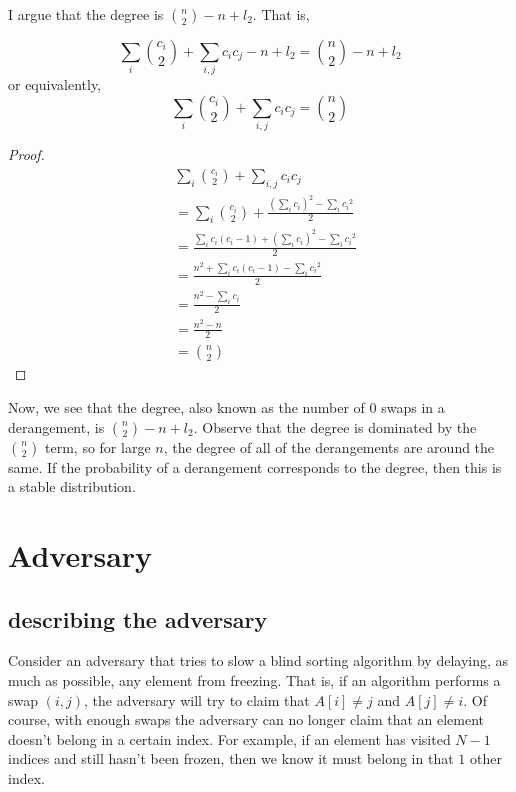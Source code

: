 \documentclass{article}
\begin{document}
I argue that the degree is ${n \choose 2} - n + l_2$. That is,

\[
    \sum_{i}{c_i \choose 2} + \sum_{i, j}{{c_i}{c_j}} - n + l_2 = {n \choose 2} - n  + l_2
\]
or equivalently,
\[
    \sum_{i}{c_i \choose 2} + \sum_{i, j}{{c_i}{c_j}} = {n \choose 2}
\]

\begin{proof}
        \begin{align}
            & \sum_{i}{c_i \choose 2} + \sum_{i, j}{{c_i}{c_j}}  \\\nonumber
            &=  \sum_{i}{c_i \choose 2} + \frac{(\sum_{i}{c_i})^2 - \sum_{i}{{c_i}^2}}{2} \\\nonumber
            &=  \frac{\sum_{i}{c_i(c_i -1)} + (\sum_{i}{c_i})^2 - \sum_{i}{{c_i}^2}}{2} \\\nonumber
            &=  \frac{n^2 + \sum_{i}{c_i(c_i - 1)} - \sum_{i}{{c_i}^2}}{2} \\\nonumber
            &=  \frac{n^2 - \sum_{i}{c_i}}{2} \\\nonumber
            &=  \frac{n^2 - n}{2} \\\nonumber
            &=  {n \choose 2}
        \end{align}
\end{proof}

Now, we see that the degree, also known as the number of 0 swaps in a derangement, is ${n \choose 2} - n + l_2 $.
Observe that the degree is dominated by the ${n \choose 2}$ term, so for large $n$, the degree of all of the
derangements are around the same. If the probability of a derangement corresponds to the degree, then this is a stable distribution.

\section{Adversary}
\subsection{describing the adversary}
Consider an adversary that tries to slow a blind sorting algorithm by delaying, as much as possible, any
element from freezing.
That is, if an algorithm performs a swap $(i, j)$, the adversary will try to claim that $A[i] \neq j$ and
$A[j] \neq i$. Of course, with enough swaps the adversary can no longer claim that an element doesn't
belong in a certain index. For example, if an element has visited $N - 1$ indices and still hasn't been frozen,
then we know it must belong in that $1$ other index.
\end{document}
